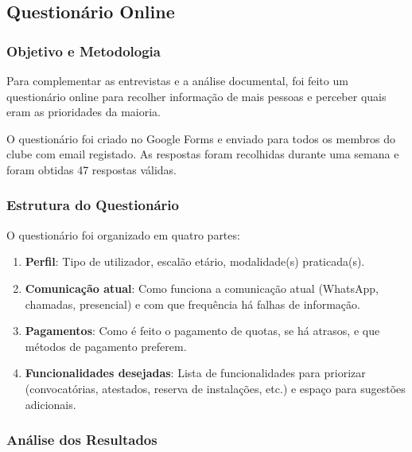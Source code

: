 

\subsection{Questionário Online}\label{sec:rel_questionario}

\subsubsection{Objetivo e Metodologia}

Para complementar as entrevistas e a análise documental, foi feito um questionário online para recolher informação de mais pessoas e perceber quais eram as prioridades da maioria.

O questionário foi criado no Google Forms e enviado para todos os membros do clube com email registado. As respostas foram recolhidas durante uma semana e foram obtidas 47 respostas válidas.

\subsubsection{Estrutura do Questionário}

O questionário foi organizado em quatro partes:

\begin{enumerate}
    \item \textbf{Perfil}: Tipo de utilizador, escalão etário, modalidade(s) praticada(s).

    \item \textbf{Comunicação atual}: Como funciona a comunicação atual (WhatsApp, chamadas, presencial) e com que frequência há falhas de informação.

    \item \textbf{Pagamentos}: Como é feito o pagamento de quotas, se há atrasos, e que métodos de pagamento preferem.

    \item \textbf{Funcionalidades desejadas}: Lista de funcionalidades para priorizar (convocatórias, atestados, reserva de instalações, etc.) e espaço para sugestões adicionais.
\end{enumerate}




\subsubsection{Análise dos Resultados}

